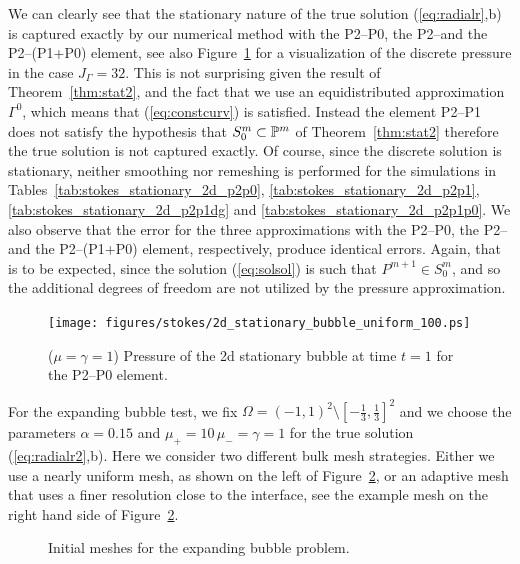 We can clearly see that the stationary nature of the true solution
(\ref{eq:radialr},b) is captured exactly by our numerical method with the
P2--P0, the P2--\pdg and the P2--(P1+P0) element, see also
Figure~\ref{fig:2d_stationary_bubble} for a visualization of the discrete
pressure in the case $J_\Gamma = 32$. This is not surprising given the
result of Theorem~\ref{thm:stat2}, and the fact that we use an equidistributed
approximation $\Gamma^0$, which means that (\ref{eq:constcurv}) is satisfied.
Instead the element P2--P1 does not satisfy the hypothesis that $S^m_0 \subset
\mathbb{P}^m$ of Theorem~\ref{thm:stat2} therefore the true solution is not
captured exactly. Of course, since the discrete solution is stationary, neither
smoothing nor remeshing is performed for the simulations in
Tables~\ref{tab:stokes_stationary_2d_p2p0},
\ref{tab:stokes_stationary_2d_p2p1}, \ref{tab:stokes_stationary_2d_p2p1dg} and
\ref{tab:stokes_stationary_2d_p2p1p0}. We also observe that the error for the
three approximations with the P2--P0, the P2--\pdg and the P2--(P1+P0)
element, respectively, produce identical errors. Again, that is to be expected,
since the solution (\ref{eq:solsol}) is such that $P^{m+1} \in S^m_0$, and so
the additional degrees of freedom are not utilized by the pressure
approximation.
\begin{figure}[htbp]
\centering
\texttt{[image: figures/stokes/2d\_stationary\_bubble\_uniform\_100.ps]}
\caption[Stokes 2d stationary bubble pressure]
{($\mu=\gamma=1$) Pressure of the 2d stationary bubble at time $t=1$
for the P2--P0 element.}
\label{fig:2d_stationary_bubble}
\end{figure}

For the expanding bubble test, we fix $\Omega = (-1,1)^2 \setminus
[-\frac13,\frac13]^2$ and we choose the parameters $\alpha = 0.15$ and $\mu_+ =
10\,\mu_- = \gamma = 1$ for the true solution (\ref{eq:radialr2},b). Here we
consider two different bulk mesh strategies. Either we use a nearly uniform
mesh, as shown on the left of Figure~\ref{fig:meshes_expanding}, or an adaptive
mesh that uses a finer resolution close to the interface, see the example mesh
on the right hand side of Figure~\ref{fig:meshes_expanding}.
\begin{figure}[htbp]
\centering
{}
\caption[Stokes 2d expanding bubble initial meshes]
{Initial meshes for the expanding bubble problem.}
\label{fig:meshes_expanding}
\end{figure}

